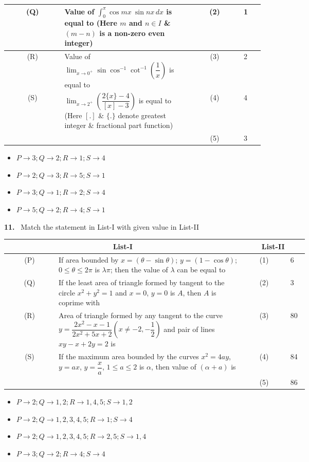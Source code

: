 \documentclass[10pt]{extarticle}
\newcommand{\qn}[1]{\par\smallskip\noindent\textbf{#1.}~}
\newenvironment{qoptions}{\begin{itemize}[leftmargin=1.8em,itemsep=1pt,topsep=2pt,label={}]}{\end{itemize}}
\newcommand{\opt}[2]{\item[(#1)] #2}
\begin{document}
\begin{multicols}{2}
{\begin{tabular}{|c|p{0.5\linewidth}|c|p{0.08\linewidth}|}
(Q) & Value of $\displaystyle\int_0^\pi\cos mx\ \sin nx\,dx$ is equal to (Here $m$ and $n\in I$ \& $(m-n)$ is a non-zero even integer) & (2) & 1\\ \hline
(R) & Value of $\displaystyle\lim_{x\to0^+}\sin\cos^{-1}\cot^{-1}\!\left(\dfrac1x\right)$ is equal to & (3) & 2\\ \hline
(S) & $\displaystyle\lim_{x\to2^+}\left(\dfrac{2\{x\}-4}{[x]-3}\right)$ is equal to (Here $[.]$ \& $\{.\}$ denote greatest integer \& fractional part function) & (4) & 4\\ \hline
 & & (5) & 3\\ \hline
\end{tabular}}\par
\begin{qoptions}
\opt{A}{$P\to3;Q\to2;R\to1;S\to4$}
\opt{B}{$P\to2;Q\to3;R\to5;S\to1$}
\opt{C}{$P\to3;Q\to1;R\to2;S\to4$}
\opt{D}{$P\to5;Q\to2;R\to4;S\to1$}
\end{qoptions}
\qn{11} Match the statement in List-I with given value in List-II\par
{\footnotesize\setlength{\tabcolsep}{2pt}\begin{tabular}{|c|p{0.62\linewidth}|c|p{0.06\linewidth}|}
\hline
\multicolumn{2}{|c|}{\textbf{List-I}} & \multicolumn{2}{c|}{\textbf{List-II}}\\ \hline
(P) & If area bounded by $x=(\theta-\sin\theta)$; $y=(1-\cos\theta)$; $0\le\theta\le2\pi$ is $\lambda\pi$; then the value of $\lambda$ can be equal to & (1) & 6\\ \hline
(Q) & If the least area of triangle formed by tangent to the circle $x^2+y^2=1$ and $x=0$, $y=0$ is $A$, then $A$ is coprime with & (2) & 3\\ \hline
(R) & Area of triangle formed by any tangent to the curve $y=\dfrac{2x^2-x-1}{2x^2+5x+2}\left(x\ne-2,-\dfrac12\right)$ and pair of lines $xy-x+2y=2$ is & (3) & 80\\ \hline
(S) & If the maximum area bounded by the curves $x^2=4ay$, $y=ax$, $y=\dfrac xa$, $1\le a\le2$ is $\alpha$, then value of $(\alpha+a)$ is & (4) & 84\\ \hline
 & & (5) & 86\\ \hline
\end{tabular}}\par
\begin{qoptions}
\opt{A}{$P\to2;Q\to1,2;R\to1,4,5;S\to1,2$}
\opt{B}{$P\to2;Q\to1,2,3,4,5;R\to1;S\to4$}
\opt{C}{$P\to2;Q\to1,2,3,4,5;R\to2,5;S\to1,4$}
\opt{D}{$P\to3;Q\to2;R\to4;S\to4$}
\end{qoptions}

\end{multicols}
\end{document}
